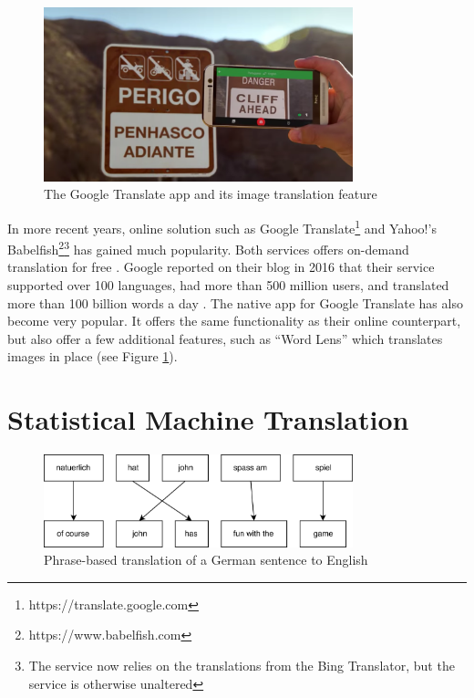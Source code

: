 \begin{figure}[H]
    \centering
    \includegraphics[width=0.8\textwidth]{fig/background_theory/google_translate_rt.png}
    \caption{The Google Translate app and its image translation feature}
    \label{fig:google-translate-rt}
\end{figure}

In more recent years, online solution such as Google Translate\footnote{https://translate.google.com} and Yahoo!'s Babelfish\footnote{https://www.babelfish.com}\footnote{The service now relies on the translations from the Bing Translator, but the service is otherwise unaltered} has gained much popularity. Both services offers on-demand translation for free \citep{schuster2016googletranslate, hutchins2007machine}. Google reported on their blog in 2016 that their service supported over 100 languages, had more than 500 million users, and translated more than 100 billion words a day \citep{turovsky2016googletranslate}. The native app for Google Translate has also become very popular. It offers the same functionality as their online counterpart, but also offer a few additional features, such as ``Word Lens'' which translates images in place (see Figure \ref{fig:google-translate-rt}).


\section{Statistical Machine Translation}
\label{sec:statistical_machine_translation}
\begin{figure}[ht]
    \centering
    \includegraphics[width=0.8\textwidth]{fig/related_work/translation.png}
    \caption{Phrase-based translation of a German sentence to English}
    \label{fig:translation-phrase-based}
\end{figure}

